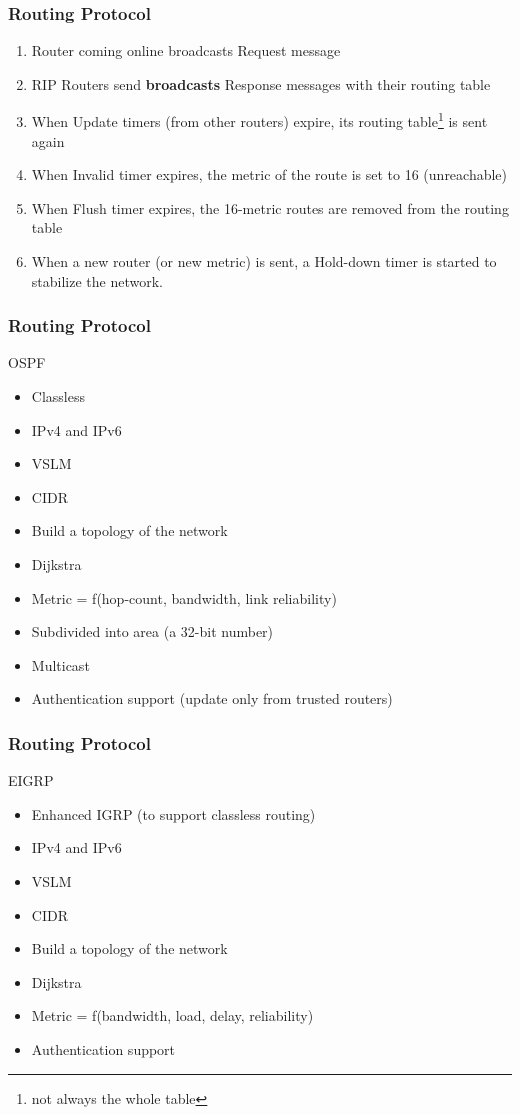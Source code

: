   \begin{frame}
    \frametitle{Routing Protocol}
      \begin{enumerate}
        \item Router coming online broadcasts Request message
        \item RIP Routers send \textbf{broadcasts} Response messages with their routing table
        \item When Update timers (from other routers) expire, its routing table\footnote{not always the whole table} is sent again
        \item When Invalid timer expires, the metric of the route is set to 16 (unreachable)
        \item When Flush timer expires, the 16-metric routes are removed from the routing table
        \item When a new router (or new metric) is sent, a Hold-down timer is started to stabilize the network.
      \end{enumerate}
  \end{frame}

  \begin{frame}
    \frametitle{Routing Protocol}
    \begin{center}OSPF \end{center}
      \begin{itemize}
        \item Classless
        \item IPv4 and IPv6
        \item VSLM
        \item CIDR
        \item Build a topology of the network
        \item Dijkstra
        \item Metric = f(hop-count, bandwidth, link reliability)
        \item Subdivided into area (a 32-bit number)
        \item Multicast
        \item Authentication support (update only from trusted routers)
      \end{itemize}
  \end{frame}

  \begin{frame}
    \frametitle{Routing Protocol}
    \begin{center}EIGRP \end{center}
      \begin{itemize}
        \item Enhanced IGRP (to support classless routing)
        \item IPv4 and IPv6
        \item VSLM
        \item CIDR
        \item Build a topology of the network
        \item Dijkstra
        \item Metric = f(bandwidth, load, delay, reliability)
        \item Authentication support
      \end{itemize}
  \end{frame}

